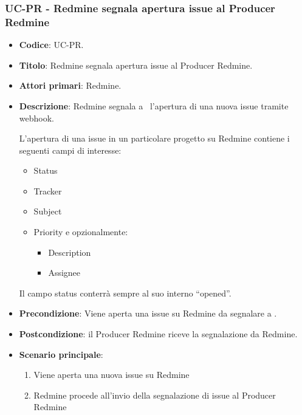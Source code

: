 \subsubsection{UC\theuccount-PR - Redmine segnala apertura issue al Producer Redmine}
	\begin{itemize}
		\item \textbf{Codice}: UC\theuccount-PR.
		\item \textbf{Titolo}: Redmine segnala apertura issue al Producer Redmine.
		\item \textbf{Attori primari}: Redmine.
		\item \textbf{Descrizione}: Redmine segnala a \progetto\ l'apertura di una nuova issue tramite webhook.
		
		L'apertura di una issue in un particolare progetto su Redmine contiene i seguenti campi di interesse:
		 \begin{itemize}
			\item Status
		 	\item Tracker
		 	\item Subject
		 	\item Priority e opzionalmente:
		 	\begin{itemize}
		 		\item Description
		 		\item Assignee
		 	\end{itemize}
		 \end{itemize}
		Il campo status conterrà sempre al suo interno ``opened''.
		\item \textbf{Precondizione}: Viene aperta una issue su Redmine da
		segnalare a \progetto.
		\item \textbf{Postcondizione}: il Producer Redmine riceve la segnalazione da Redmine.
		\item \textbf{Scenario principale}: 
		\begin{enumerate}
			\item Viene aperta una nuova issue su Redmine
			\item Redmine procede all'invio della segnalazione di issue al Producer Redmine
		\end{enumerate}
		
	\end{itemize}

